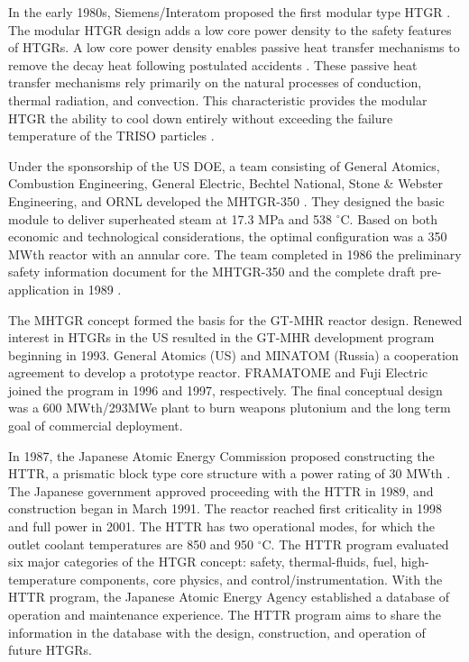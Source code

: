 In the early 1980s, Siemens/Interatom proposed the first modular type HTGR \cite{brey_development_2001}.
The modular HTGR design adds a low core power density to the safety features of HTGRs.
A low core power density enables passive heat transfer mechanisms to remove the decay heat following postulated accidents \cite{neylan_modular_1988}.
These passive heat transfer mechanisms rely primarily on the natural processes of conduction, thermal radiation, and convection.
This characteristic provides the modular HTGR the ability to cool down entirely without exceeding the failure temperature of the TRISO particles \cite{brey_development_2001}.

Under the sponsorship of the \gls{US} \gls{DOE}, a team consisting of General Atomics, Combustion Engineering, General Electric, Bechtel National, Stone \& Webster Engineering, and \gls{ORNL} developed the \gls{MHTGR}-350 \cite{neylan_modular_1988} \cite{silady_licensing_1988}.
They designed the basic module to deliver superheated steam at 17.3 MPa and 538 $^{\circ}$C.
Based on both economic and technological considerations, the optimal configuration was a 350 MWth reactor with an annular core.
The team completed in 1986 the preliminary safety information document for the MHTGR-350 and the complete draft pre-application in 1989 \cite{huning_steady_2014}.

The MHTGR concept formed the basis for the \gls{GT-MHR} reactor design.
Renewed interest in HTGRs in the US resulted in the GT-MHR development program beginning in 1993.
General Atomics (US) and MINATOM (Russia) a cooperation agreement to develop a prototype reactor.
FRAMATOME and Fuji Electric joined the program in 1996 and 1997, respectively.
The final conceptual design was a 600 MWth/293MWe plant to burn weapons plutonium and the long term goal of commercial deployment.

In 1987, the Japanese Atomic Energy Commission proposed constructing the \gls{HTTR}, a prismatic block type core structure with a power rating of 30 MWth \cite{iaea_current_2001}.
The Japanese government approved proceeding with the HTTR in 1989, and construction began in March 1991.
The reactor reached first criticality in 1998 and full power in 2001.
The HTTR has two operational modes, for which the outlet coolant temperatures are 850 and 950 $^{\circ}$C.
The HTTR program evaluated six major categories of the HTGR concept: safety, thermal-fluids, fuel, high-temperature components, core physics, and control/instrumentation.
With the HTTR program, the Japanese Atomic Energy Agency established a database of operation and maintenance experience.
The HTTR program aims to share the information in the database with the design, construction, and operation of future HTGRs.


